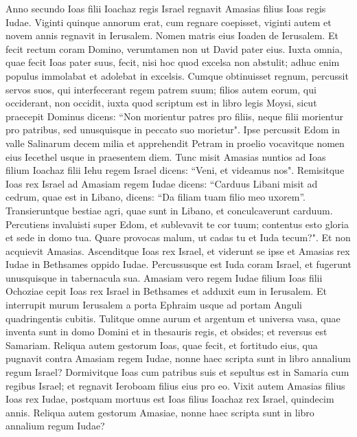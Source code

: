 \begin{biblechapter}  
\verse Anno secundo Ioas filii Ioachaz regis Israel regnavit Amasias filius Ioas regis Iudae. 
\verse Viginti quinque annorum erat, cum regnare coepisset, viginti autem et novem annis regnavit in Ierusalem. Nomen matris eius Ioaden de Ierusalem. 
\verse Et fecit rectum coram Domino, verumtamen non ut David pater eius. Iuxta omnia, quae fecit Ioas pater suus, fecit, 
\verse nisi hoc quod excelsa non abstulit; adhuc enim populus immolabat et adolebat in excelsis.  
\verse Cumque obtinuisset regnum, percussit servos suos, qui interfecerant regem patrem suum; 
\verse filios autem eorum, qui occiderant, non occidit, iuxta quod scriptum est in libro legis Moysi, sicut praecepit Dominus dicens: “Non morientur patres pro filiis, neque filii morientur pro patribus, sed unusquisque in peccato suo morietur". 
\verse Ipse percussit Edom in valle Salinarum decem milia et apprehendit Petram in proelio vocavitque nomen eius Iecethel usque in praesentem diem. 
\verse Tunc misit Amasias nuntios ad Ioas filium Ioachaz filii Iehu regem Israel dicens: “Veni, et videamus nos". 
\verse Remisitque Ioas rex Israel ad Amasiam regem Iudae dicens: “Carduus Libani misit ad cedrum, quae est in Libano, dicens: “Da filiam tuam filio meo uxorem”. Transieruntque bestiae agri, quae sunt in Libano, et conculcaverunt carduum. 
\verse Percutiens invaluisti super Edom, et sublevavit te cor tuum; contentus esto gloria et sede in domo tua. Quare provocas malum, ut cadas tu et Iuda tecum?". 
\verse Et non acquievit Amasias. Ascenditque Ioas rex Israel, et viderunt se ipse et Amasias rex Iudae in Bethsames oppido Iudae. 
\verse Percussusque est Iuda coram Israel, et fugerunt unusquisque in tabernacula sua. 
\verse Amasiam vero regem Iudae filium Ioas filii Ochoziae cepit Ioas rex Israel in Bethsames et adduxit eum in Ierusalem. Et interrupit murum Ierusalem a porta Ephraim usque ad portam Anguli quadringentis cubitis. 
\verse Tulitque omne aurum et argentum et universa vasa, quae inventa sunt in domo Domini et in thesauris regis, et obsides; et reversus est Samariam. 
\verse Reliqua autem gestorum Ioas, quae fecit, et fortitudo eius, qua pugnavit contra Amasiam regem Iudae, nonne haec scripta sunt in libro annalium regum Israel? 
\verse Dormivitque Ioas cum patribus suis et sepultus est in Samaria cum regibus Israel; et regnavit Ieroboam filius eius pro eo. 
\verse Vixit autem Amasias filius Ioas rex Iudae, postquam mortuus est Ioas filius Ioachaz rex Israel, quindecim annis. 
\verse Reliqua autem gestorum Amasiae, nonne haec scripta sunt in libro annalium regum Iudae? 

\end{biblechapter}

